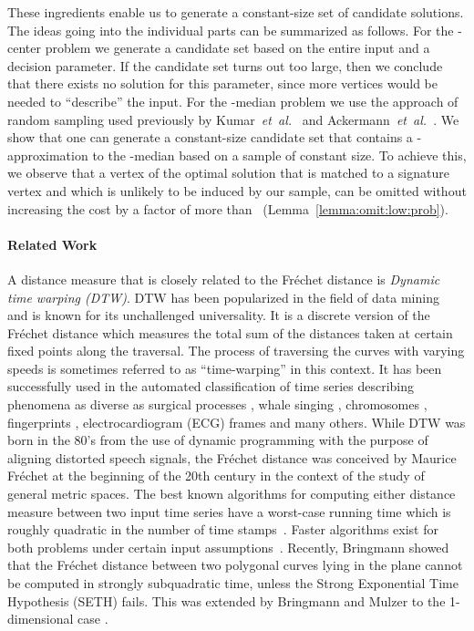\documentclass[11pt, letter]{article}
\newcommand{\etal}{\textit{e{}t~a{}l.}\xspace}
\newcommand{\lemref}[1]{Lemma~\ref{lemma:#1}}
\newcommand{\Frechet}{Fr\'echet\xspace}
\begin{document}
These ingredients enable us to generate a constant-size set of candidate solutions.
The ideas going into the individual parts can be summarized as follows.
For the -center problem we generate a candidate set based on the 
entire input and a decision parameter. If the candidate set turns out too large,
then we conclude that there exists no solution for this parameter, since more
vertices would be needed to ``describe'' the input. 
For the -median problem we use the approach of random sampling used
previously by Kumar~\etal~\cite{kumar2010lineartime} and Ackermann~\etal~\cite{abs-cm-10}.
We show that one can generate a constant-size candidate set that contains a
-approximation to the -median based on a sample of constant size.
To achieve this, we observe that a vertex of the optimal solution that is
matched to a signature vertex and which is unlikely to be induced by our
sample, can be omitted without increasing the cost by a factor of more than
~(\lemref{omit:low:prob}).



\paragraph{Related Work}
A distance measure that is closely related to the \Frechet{} distance is \emph{Dynamic time warping (DTW)}.
DTW has been popularized in the field of data mining~\cite{dtswk-08,mueller07dtw} and is known for its unchallenged
universality.
It is a discrete version of the \Frechet
distance which measures the total sum of the distances taken at certain fixed
points along the traversal. The process of traversing the curves with varying
speeds is sometimes referred to as ``time-warping'' in this context.
It has been successfully used in the automated classification of time series
describing phenomena as diverse as surgical processes \cite{Forestier2012255},
whale singing \cite{bmp-ackw-07}, chromosomes \cite{Legrand2008215},
fingerprints \cite{888711}, electrocardiogram (ECG) frames \cite{1013101} and
many others.  
While DTW was born in the 80's from the use of dynamic programming with the
purpose of aligning distorted speech signals, the \Frechet{} distance was
conceived by Maurice \Frechet{} at the beginning of the 20th century in the
context of the study of general metric spaces. 
The best known algorithms for computing either distance measure between two
input time series have a worst-case running time which is roughly quadratic in
the number of time stamps~\cite{buchin2012four, mueller07dtw}. Faster
algorithms exist for both problems under certain input
assumptions~\cite{dhw-afd-12,keogh2005exact}. Recently, Bringmann
showed~\cite{Bringmann14} that the \Frechet{} distance between two polygonal
curves lying in the plane cannot be computed in strongly subquadratic time, unless
the Strong Exponential Time Hypothesis (SETH) fails. This was extended by Bringmann and Mulzer to the 1-dimensional case \cite{bm-adfd-15}.
\end{document}
